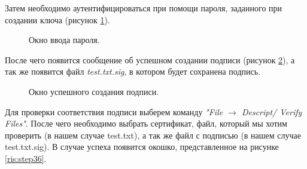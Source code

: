 \documentclass[10pt,a4paper]{report}
\begin{document}
Затем необходимо аутентифицироваться при помощи пароля, заданного при создании ключа (рисунок \ref{ris:step34}).

\begin{figure}[h]
	\caption{Окно ввода пароля.}
	\label{ris:step34}
\end{figure}

После чего появится сообщение об успешном создании подписи (рисунок \ref{ris:step35}), а так же появится файл \textit{test.txt.sig}, в котором будет сохранена подпись.

\begin{figure}[h]
	\caption{Окно успешного создания подписи.}
	\label{ris:step35}
\end{figure}

Для проверки соответствия подписи выберем команду \textit{"File \begin{math}\to\end{math} Descript/ Verify Files"}. После чего необходимо выбрать сертификат, файл, который мы хотим проверить (в нашем случае test.txt), а так же файл с подписью (в нашем случае test.txt.sig). В случае успеха появится окошко, представленное на рисунке \ref{ris:step36}.
\end{document}
